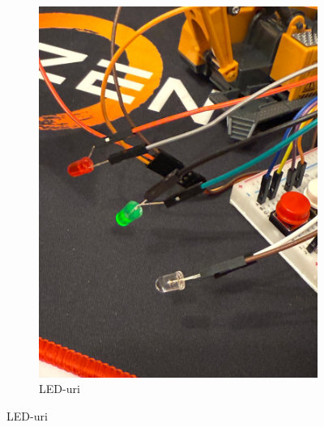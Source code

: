 \begin{figure}[h!]
\begin{subfigure}[b]{0.3\textwidth}
      \includegraphics[width=\textwidth]{figures/3.jpg}
      \caption{LED-uri}
  \end{subfigure}


\end{figure}
